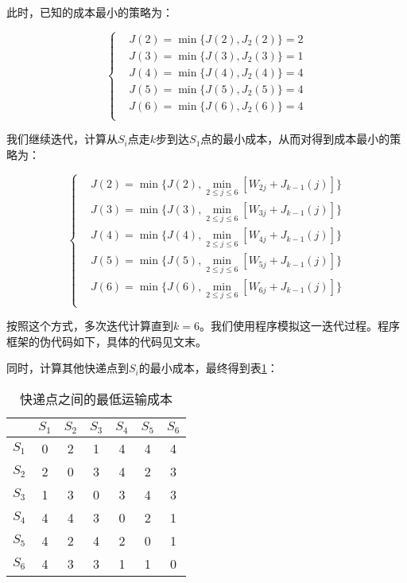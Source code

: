 \documentclass[UTF8]{ctexart}
\begin{document}
此时，已知的成本最小的策略为：

\begin{equation*}
    \left\{
    \begin{aligned}
        &J(2)=\min\{J(2),J_2(2)\}=2 \\
        &J(3)=\min\{J(3),J_2(3)\}=1 \\
        &J(4)=\min\{J(4),J_2(4)\}=4 \\
        &J(5)=\min\{J(5),J_2(5)\}=4 \\
        &J(6)=\min\{J(6),J_2(6)\}=4 \\
    \end{aligned}
    \right.
\end{equation*}

我们继续迭代，计算从$S_i$点走$k$步到达$S_1$点的最小成本，从而对得到成本最小的策略为：

\begin{equation*}
    \left\{
    \begin{aligned}
        &J(2)=\min\{J(2),\min_{2\leq j\leq6}[W_{2j}+J_{k-1}(j)]\} \\
        &J(3)=\min\{J(3),\min_{2\leq j\leq6}[W_{3j}+J_{k-1}(j)]\} \\
        &J(4)=\min\{J(4),\min_{2\leq j\leq6}[W_{4j}+J_{k-1}(j)]\} \\
        &J(5)=\min\{J(5),\min_{2\leq j\leq6}[W_{5j}+J_{k-1}(j)]\} \\
        &J(6)=\min\{J(6),\min_{2\leq j\leq6}[W_{6j}+J_{k-1}(j)]\} \\
    \end{aligned}
    \right.
\end{equation*}

按照这个方式，多次迭代计算直到$k=6$。我们使用程序模拟这一迭代过程。程序框架的伪代码如下，具体的代码见文末。



同时，计算其他快递点到$S_i$的最小成本，最终得到表\ref{tab:mincosts}：

\begin{table}[ht]
    \centering
    \caption{快递点之间的最低运输成本}
    \begin{tabular}{|c|c|c|c|c|c|c|}
    \hline
        & $S_1$ & $S_2$ & $S_3$ & $S_4$ & $S_5$ & $S_6$ \\ \hline
        $S_1$ & 0 & 2 & 1 & 4 & 4 & 4 \\ \hline
        $S_2$ & 2 & 0 & 3 & 4 & 2 & 3 \\ \hline
        $S_3$ & 1 & 3 & 0 & 3 & 4 & 3 \\ \hline
        $S_4$ & 4 & 4 & 3 & 0 & 2 & 1 \\ \hline
        $S_5$ & 4 & 2 & 4 & 2 & 0 & 1 \\ \hline
        $S_6$ & 4 & 3 & 3 & 1 & 1 & 0 \\ \hline
    \end{tabular}
    \label{tab:mincosts}
\end{table}
\end{document}
